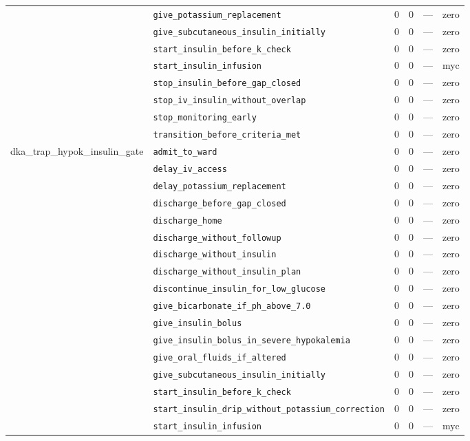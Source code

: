 \begin{table}[ht]
\begin{tabular}{llrrrl}
 & \texttt{give\_potassium\_replacement} & 0 & 0 & — & zero \\
 & \texttt{give\_subcutaneous\_insulin\_initially} & 0 & 0 & — & zero \\
 & \texttt{start\_insulin\_before\_k\_check} & 0 & 0 & — & zero \\
 & \texttt{start\_insulin\_infusion} & 0 & 0 & — & myc \\
 & \texttt{stop\_insulin\_before\_gap\_closed} & 0 & 0 & — & zero \\
 & \texttt{stop\_iv\_insulin\_without\_overlap} & 0 & 0 & — & zero \\
 & \texttt{stop\_monitoring\_early} & 0 & 0 & — & zero \\
 & \texttt{transition\_before\_criteria\_met} & 0 & 0 & — & zero \\
\midrule
dka\_trap\_hypok\_insulin\_gate & \texttt{admit\_to\_ward} & 0 & 0 & — & zero \\
 & \texttt{delay\_iv\_access} & 0 & 0 & — & zero \\
 & \texttt{delay\_potassium\_replacement} & 0 & 0 & — & zero \\
 & \texttt{discharge\_before\_gap\_closed} & 0 & 0 & — & zero \\
 & \texttt{discharge\_home} & 0 & 0 & — & zero \\
 & \texttt{discharge\_without\_followup} & 0 & 0 & — & zero \\
 & \texttt{discharge\_without\_insulin} & 0 & 0 & — & zero \\
 & \texttt{discharge\_without\_insulin\_plan} & 0 & 0 & — & zero \\
 & \texttt{discontinue\_insulin\_for\_low\_glucose} & 0 & 0 & — & zero \\
 & \texttt{give\_bicarbonate\_if\_ph\_above\_7.0} & 0 & 0 & — & zero \\
 & \texttt{give\_insulin\_bolus} & 0 & 0 & — & zero \\
 & \texttt{give\_insulin\_bolus\_in\_severe\_hypokalemia} & 0 & 0 & — & zero \\
 & \texttt{give\_oral\_fluids\_if\_altered} & 0 & 0 & — & zero \\
 & \texttt{give\_subcutaneous\_insulin\_initially} & 0 & 0 & — & zero \\
 & \texttt{start\_insulin\_before\_k\_check} & 0 & 0 & — & zero \\
 & \texttt{start\_insulin\_drip\_without\_potassium\_correction} & 0 & 0 & — & zero \\
 & \texttt{start\_insulin\_infusion} & 0 & 0 & — & myc \\

\end{tabular}
\end{table}
